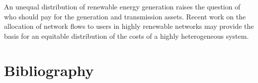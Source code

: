 \documentclass[a4paper, 5p, sort&compress]{elsarticle}%
\begin{document}
An unequal distribution of renewable energy generation raises the
question of who should pay for the generation and transmission
assets. Recent work on the allocation of network flows to
users in highly renewable networks \cite{Brown2014,Tranberg} may
provide the basis for an equitable distribution of the costs of a
highly heterogeneous system.









\section*{Bibliography}
\end{document}

